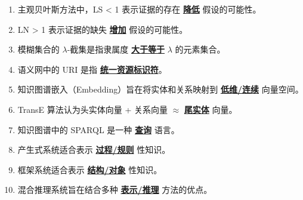 \documentclass[12pt,a4paper,openany]{ctexbook}
\begin{document}
\begin{enumerate}[resume,leftmargin=2em,itemsep=1pt]
\item 主观贝叶斯方法中，LS < 1 表示证据的存在 \underline{\textbf{降低}} 假设的可能性。
\item LN > 1 表示证据的缺失 \underline{\textbf{增加}} 假设的可能性。
\item 模糊集合的 $\lambda$-截集是指隶属度 \underline{\textbf{大于等于}} $\lambda$ 的元素集合。
\item 语义网中的 URI 是指 \underline{\textbf{统一资源标识符}}。
\item 知识图谱嵌入（Embedding）旨在将实体和关系映射到 \underline{\textbf{低维/连续}} 向量空间。
\item TransE 算法认为头实体向量 + 关系向量 $\approx$ \underline{\textbf{尾实体}} 向量。
\item 知识图谱中的 SPARQL 是一种 \underline{\textbf{查询}} 语言。
\item 产生式系统适合表示 \underline{\textbf{过程/规则}} 性知识。
\item 框架系统适合表示 \underline{\textbf{结构/对象}} 性知识。
\item 混合推理系统旨在结合多种 \underline{\textbf{表示/推理}} 方法的优点。
\end{enumerate}
\end{document}
